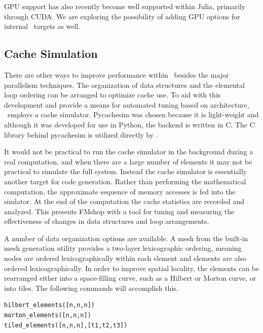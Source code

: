 \documentclass[twoside,leqno,twocolumn]{article}
\begin{document}
GPU support has also recently become well supported within Julia\cite{juliagpu}, primarily through CUDA. We are exploring the possibility of adding GPU options for internal \FMshop\ targets as well.

\subsection{Cache Simulation}
There are other ways to improve performance within \FMshop\ besides the major parallelism techniques. The organization of data structures and the elemental loop ordering can be arranged to optimize cache use. To aid with this development and provide a means for automated tuning based on architecture, \FMshop\ employs a cache simulator. Pycachesim\cite{pycachesim} was chosen because it is light-weight and although it was developed for use in Python, the backend is written in C. The C library behind pycachesim is utilized directly by \FMshop. 

It would not be practical to run the cache simulator in the background during a real computation, and when there are a large number of elements it may not be practical to simulate the full system. Instead the cache simulator is essentially another target for code generation. Rather than performing the mathematical computation, the approximate sequence of memory accesses is fed into the simlator. At the end of the computation the cache statistics are recorded and analyzed. This presents FMshop with a tool for tuning and measuring the effectiveness of changes in data structures and loop arrangements.

A number of data organization options are available. A mesh from the built-in mesh generation utility provides a two-layer lexicographic ordering, meaning nodes are ordered lexicographically within each element and elements are also ordered lexicographically. In order to improve spatial locality, the elements can be rearranged either into a space-filling curve, such as a Hilbert or Morton curve, or into tiles. The following commands will accomplish this.
\begin{verbatim}
hilbert_elements([n,n,n])
morton_elements([n,n,n])
tiled_elements([n,n,n],[t1,t2,t3])
\end{verbatim}
\end{document}
